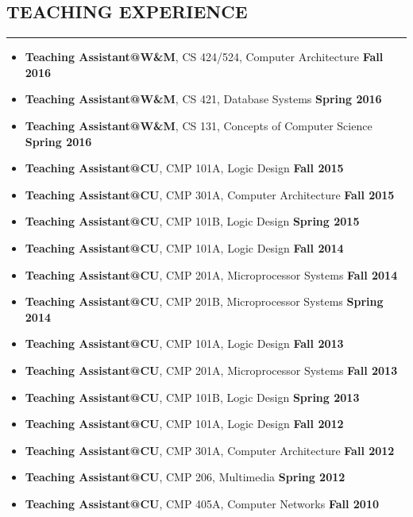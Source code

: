 \documentclass[10pt,a4]{article}
\begin{document}
\subsection*{TEACHING EXPERIENCE}
\hrule
\vspace{0.2cm}
\begin{itemize}
\item{\bf Teaching Assistant@W\&M}, CS 424/524, Computer Architecture \hfill {\bf Fall 2016} 
\item{\bf Teaching Assistant@W\&M}, CS 421, Database Systems \hfill {\bf Spring 2016} 
\item{\bf Teaching Assistant@W\&M}, CS 131, Concepts of Computer Science \hfill {\bf Spring 2016}
\item{\bf Teaching Assistant@CU}, CMP 101A, Logic Design \hfill {\bf Fall 2015}
\item{\bf Teaching Assistant@CU}, CMP 301A, Computer Architecture \hfill {\bf Fall 2015}
\item{\bf Teaching Assistant@CU}, CMP 101B, Logic Design \hfill {\bf Spring 2015}			%
\item{\bf Teaching Assistant@CU}, CMP 101A, Logic Design \hfill {\bf Fall 2014}
\item{\bf Teaching Assistant@CU}, CMP 201A, Microprocessor Systems \hfill {\bf Fall 2014}
\item{\bf Teaching Assistant@CU}, CMP 201B, Microprocessor Systems \hfill {\bf Spring 2014}
\item{\bf Teaching Assistant@CU}, CMP 101A, Logic Design \hfill {\bf Fall 2013}
\item{\bf Teaching Assistant@CU}, CMP 201A, Microprocessor Systems \hfill {\bf Fall 2013}
\item{\bf Teaching Assistant@CU}, CMP 101B, Logic Design \hfill {\bf Spring 2013}			%
\item{\bf Teaching Assistant@CU}, CMP 101A, Logic Design \hfill {\bf Fall 2012}
\item{\bf Teaching Assistant@CU}, CMP 301A, Computer Architecture \hfill {\bf Fall 2012}	%
\item{\bf Teaching Assistant@CU}, CMP 206, Multimedia \hfill {\bf Spring 2012}
\item{\bf Teaching Assistant@CU}, CMP 405A, Computer Networks \hfill {\bf Fall 2010}
\end{itemize}

\end{document}
